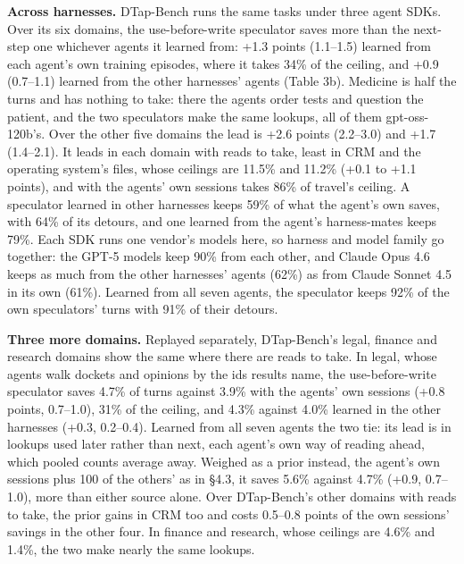 \documentclass[10pt,twocolumn,letterpaper]{article}
\newcommand{\runin}[1]{{\sffamily\bfseries\color{accent}#1}}
\begin{document}
\runin{Across harnesses.} DTap-Bench runs the same tasks under three agent SDKs. Over its six domains, the use-before-write speculator saves more than the next-step one whichever agents it learned from: +1.3 points (1.1--1.5) learned from each agent's own training episodes, where it takes 34\% of the ceiling, and +0.9 (0.7--1.1) learned from the other harnesses' agents (Table 3b). Medicine is half the turns and has nothing to take: there the agents order tests and question the patient, and the two speculators make the same lookups, all of them gpt-oss-120b's. Over the other five domains the lead is +2.6 points (2.2--3.0) and +1.7 (1.4--2.1). It leads in each domain with reads to take, least in CRM and the operating system's files, whose ceilings are 11.5\% and 11.2\% (+0.1 to +1.1 points), and with the agents' own sessions takes 86\% of travel's ceiling. A speculator learned in other harnesses keeps 59\% of what the agent's own saves, with 64\% of its detours, and one learned from the agent's harness-mates keeps 79\%. Each SDK runs one vendor's models here, so harness and model family go together: the GPT-5 models keep 90\% from each other, and Claude Opus 4.6 keeps as much from the other harnesses' agents (62\%) as from Claude Sonnet 4.5 in its own (61\%). Learned from all seven agents, the speculator keeps 92\% of the own speculators' turns with 91\% of their detours.

\runin{Three more domains.} Replayed separately, DTap-Bench's legal, finance and research domains show the same where there are reads to take. In legal, whose agents walk dockets and opinions by the ids results name, the use-before-write speculator saves 4.7\% of turns against 3.9\% with the agents' own sessions (+0.8 points, 0.7--1.0), 31\% of the ceiling, and 4.3\% against 4.0\% learned in the other harnesses (+0.3, 0.2--0.4). Learned from all seven agents the two tie: its lead is in lookups used later rather than next, each agent's own way of reading ahead, which pooled counts average away. Weighed as a prior instead, the agent's own sessions plus 100 of the others' as in §4.3, it saves 5.6\% against 4.7\% (+0.9, 0.7--1.0), more than either source alone. Over DTap-Bench's other domains with reads to take, the prior gains in CRM too and costs 0.5--0.8 points of the own sessions' savings in the other four. In finance and research, whose ceilings are 4.6\% and 1.4\%, the two make nearly the same lookups.
\end{document}
